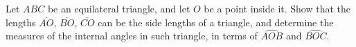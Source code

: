 Let $ABC$ be an equilateral triangle,
and let $O$ be a point inside it.
Show that the lengths $\overline{AO}$, $\overline{BO}$, $\overline{CO}$
can be the side lengths of a triangle,
and determine the measures of the internal angles in such triangle,
in terms of $\widehat{AOB}$ and $\widehat{BOC}$.

